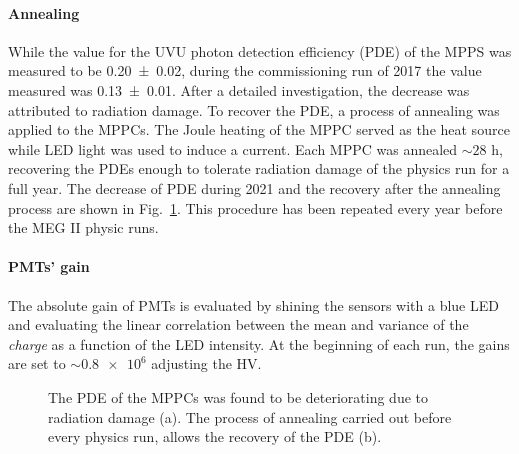 \begin{refsection}
        \paragraph{Annealing}
        While the value for the UVU photon detection efficiency (PDE) of the MPPS was measured to be \num{0.20(2)}, during the commissioning run of 2017 the value measured was \num{0.13(1)}.
        After a detailed investigation, the decrease was attributed to radiation damage.
        To recover the PDE, a process of annealing was applied to the MPPCs.
        The Joule heating of the MPPC served as the heat source while LED light was used to induce a current.  
        Each MPPC was annealed $\sim28$ h, recovering the PDEs enough to tolerate radiation damage of the physics run for a full year.
        The decrease of PDE during 2021 and the recovery after the annealing process are shown in Fig.~\ref{fig:MEC:XEC:PDE}.
        This procedure has been repeated every year before the MEG II physic runs.

        \paragraph{PMTs' gain} The absolute gain of PMTs is evaluated by shining the sensors with a blue LED and evaluating the linear correlation between the mean and variance of the \textit{charge} as a function of the LED intensity.
        At the beginning of each run, the gains are set to $\sim\num{0.8e6}$ adjusting the HV. 

         \begin{figure}[]   
            \centering
            \caption[XEC: PDE and annealing]{The PDE of the MPPCs was found to be deteriorating due to radiation damage (a). The process of annealing carried out before every physics run, allows the recovery of the PDE (b).}
            \label{fig:MEC:XEC:PDE}
        \end{figure}
        

\end{refsection}
